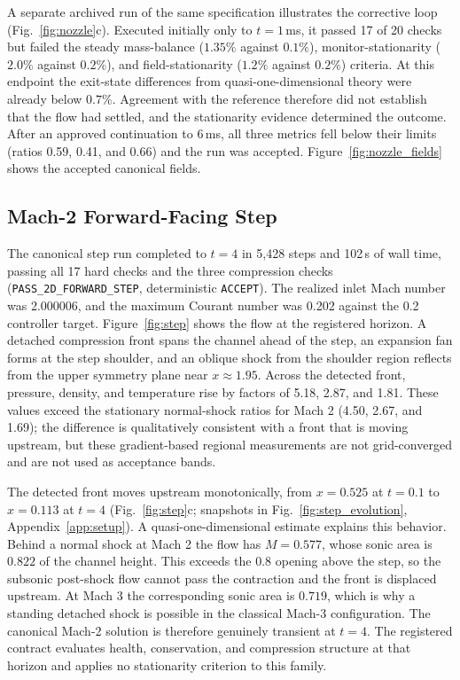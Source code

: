 \documentclass[11pt]{article}
\begin{document}
A separate archived run of the same specification illustrates the
corrective loop (Fig.~\ref{fig:nozzle}c). Executed initially only to
$t=1$\,ms, it passed 17 of 20 checks but failed the steady mass-balance
($1.35\%$ against $0.1\%$), monitor-stationarity ($2.0\%$ against $0.2\%$),
and field-stationarity ($1.2\%$ against $0.2\%$) criteria. At this
endpoint the exit-state differences from quasi-one-dimensional theory were
already below $0.7\%$. Agreement with the reference therefore did not
establish that the flow had settled, and the stationarity evidence
determined the outcome. After an approved continuation to 6\,ms, all three
metrics fell below their limits (ratios 0.59, 0.41, and 0.66) and the run
was accepted. Figure~\ref{fig:nozzle_fields} shows the accepted canonical
fields.

\subsection{Mach-2 Forward-Facing Step}
\label{sec:step_results}

The canonical step run completed to $t=4$ in 5,428 steps and 102\,s of wall
time, passing all 17 hard checks and the three compression checks
(\texttt{PASS\_2D\_FORWARD\_STEP}, deterministic \texttt{ACCEPT}). The
realized inlet Mach number was 2.000006, and the maximum Courant number was
0.202 against the 0.2 controller target. Figure~\ref{fig:step} shows the
flow at the registered horizon. A detached compression front spans the
channel ahead of the step, an expansion fan forms at the step shoulder, and
an oblique shock from the shoulder region reflects from the upper symmetry
plane near $x\approx1.95$. Across the detected front, pressure, density,
and temperature rise by factors of 5.18, 2.87, and 1.81. These values exceed
the stationary normal-shock ratios for Mach 2 (4.50, 2.67, and 1.69); the
difference is qualitatively consistent with a front that is moving
upstream, but these gradient-based regional measurements are not
grid-converged and are not used as acceptance bands.

The detected front moves upstream monotonically, from $x=0.525$ at $t=0.1$
to $x=0.113$ at $t=4$ (Fig.~\ref{fig:step}c; snapshots in Fig.~\ref{fig:step_evolution}, Appendix~\ref{app:setup}).
A quasi-one-dimensional
estimate explains this behavior. Behind a normal shock at Mach 2 the flow
has $M=0.577$, whose sonic area is $0.822$ of the channel height. This
exceeds the $0.8$ opening above the step, so the subsonic post-shock flow
cannot pass the contraction and the front is displaced upstream. At Mach 3
the corresponding sonic area is $0.719$, which is why a standing detached
shock is possible in the classical Mach-3 configuration. The canonical
Mach-2 solution is therefore genuinely transient at $t=4$. The registered
contract evaluates health, conservation, and compression structure at that
horizon and applies no stationarity criterion to this family.
\end{document}
